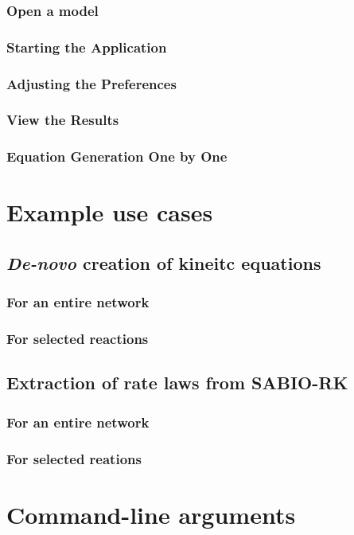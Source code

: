 \subsection{Open a model}
\subsection{Starting the Application}
\subsection{Adjusting the Preferences}
\subsection{View the Results}
\subsection{Equation Generation One by One}


\chapter{Example use cases}

\section{\emph{De-novo} creation of kineitc equations}
\subsection{For an entire network}
\subsection{For selected reactions}
\section{Extraction of rate laws from SABIO-RK}
\subsection{For an entire network}
\subsection{For selected reations}


\chapter{Command-line arguments}

